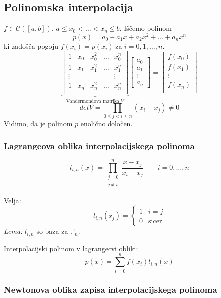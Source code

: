 \begin{multicols}{5}
\subsection*{Polinomska interpolacija}
$f \in \mathcal{C}([a,b])$, $a \leq x_0 < \dots < x_n \leq b$. Iščemo polinom
\[ p(x) = a_0 + a_1 x + a_2 x^2 + \dots + a_n x^n \]
ki zadošča pogoju $f(x_i) = p(x_i)$ za $i = 0, 1, \dots, n$. 
\[
\underbrace{\begin{bmatrix}
    1 & x_0 & x_0^2 & \dots & x_0^n \\
    1 & x_1 & x_1^2 & \dots & x_1^n \\
    \vdots & &        &       & \vdots \\
    1 & x_n & x_n^2 & \dots & x_n^n \\
\end{bmatrix}}_{\text{Vandermondova matrika $V$}}
\begin{bmatrix}
    a_0 \\
    a_1 \\
    \vdots \\
    a_n
\end{bmatrix}
=
\begin{bmatrix}
    f(x_0) \\
    f(x_1) \\
    \vdots \\
    f(x_n) \\
\end{bmatrix}
\]
\[ det V = \prod_{0 \leq j < i \leq n} (x_i - x_j) \neq 0\]
Vidimo, da je polinom $p$ enolično določen.

\subsubsection*{Lagrangeova oblika interpolacijskega polinoma}
\[ l_{i, n}(x) = \prod_{\substack{j=0 \\ j\neq i}}^n \frac{x-x_j}{x_i - x_j} \qquad i = 0, \dots, n \]

Velja:
\[ 
l_{i,n}(x_j) = 
\begin{cases}
    1 & i = j \\
    0 & \text{sicer}
\end{cases}
\]
\textit{Lema:} $l_{i, n}$ so baza za $\mathbb{P}_n$.
%

Interpolacijski polinom v lagrangeovi obliki:
\[ p(x) = \sum_{i=0}^n f(x_i) l_{i,n}(x)\]

\subsubsection*{Newtonova oblika zapisa interpolacijskega polinoma}


\end{multicols}
